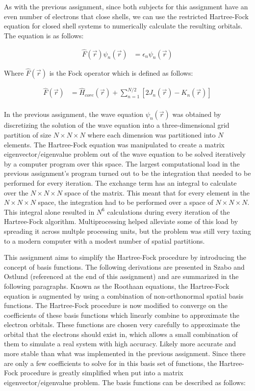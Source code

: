 \documentclass[10pt, oneside, letterpaper]{article}
\begin{document}
As with the previous assignment, since both subjects for this assignment have an even number of electrons that close shells, we can use the restricted Hartree-Fock equation for closed shell systems to numerically calculate the resulting orbitals. The equation is as follows:

\begin{align*}
  \hat{F}(\vec{r})\psi_n(\vec{r}) &= \epsilon_n\psi_n(\vec{r})
\end{align*}

Where $\hat{F}(\vec{r})$ is the Fock operator which is defined as follows:

\begin{align*}
  \hat{F}(\vec{r}) &= \hat{H}_{core}(\vec{r}) + \sum_{n=1}^{N/2}\left[2J_n(\vec{r}) - K_n(\vec{r})\right]\\
\end{align*}

In the previous assignment, the wave equation $\psi_n(\vec{r})$ was obtained by discretizing the solution of the wave equation into a three-dimensional grid partition of size $N \times N \times N$ where each dimension was partitioned into $N$ elements. The Hartree-Fock equation was manipulated to create a matrix eigenvector/eigenvalue problem out of the wave equation to be solved iteratively by a computer program over this space. The largest computational load in the previous assignment's program turned out to be the integration that needed to be performed for every iteration. The exchange term has an integral to calculate over the $N \times N \times N$ space of the matrix. This meant that for every element in the $N \times N \times N$ space, the integration had to be performed over a space of $N \times N \times N$. This integral alone resulted in $N^6$ calculations during every iteration of the Hartree-Fock algorithm. Multiprocessing helped alleviate some of this load by spreading it across multple processing units, but the problem was still very taxing to a modern computer with a modest number of spatial partitions.

This assignment aims to simplify the Hartree-Fock procedure by introducing the concept of basis functions. The following derivations are presented in Szabo and Ostlund (referenced at the end of this assignment) and are summarized in the following paragraphs. Known as the Roothaan equations, the Hartree-Fock equation is augmented by using a combination of non-orthonormal spatial basis functions. The Hartree-Fock procedure is now modified to converge on the coefficients of these basis functions which linearly combine to approximate the electron orbitals. These functions are chosen very carefully to approximate the orbital that the electrons should exist in, which allows a small combination of them to simulate a real system with high accuracy. Likely more accurate and more stable than what was implemented in the previous assignment. Since there are only a few coefficients to solve for in this basis set of functions, the Hartree-Fock procedure is greatly simplified when put into a matrix eigenvector/eigenvalue problem. The basis functions can be described as follows:
\end{document}
